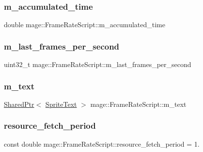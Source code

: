 \subsubsection{\texorpdfstring{m\+\_\+accumulated\+\_\+time}{m\_accumulated\_time}}
{\footnotesize\ttfamily double mage\+::\+Frame\+Rate\+Script\+::m\+\_\+accumulated\+\_\+time\hspace{0.3cm}{\ttfamily [private]}}

\hypertarget{classmage_1_1_frame_rate_script_a6126772a3b500a0c044837f432d10976}{}\label{classmage_1_1_frame_rate_script_a6126772a3b500a0c044837f432d10976} 
\subsubsection{\texorpdfstring{m\+\_\+last\+\_\+frames\+\_\+per\+\_\+second}{m\_last\_frames\_per\_second}}
{\footnotesize\ttfamily uint32\+\_\+t mage\+::\+Frame\+Rate\+Script\+::m\+\_\+last\+\_\+frames\+\_\+per\+\_\+second\hspace{0.3cm}{\ttfamily [private]}}

\hypertarget{classmage_1_1_frame_rate_script_a7d55db21f500e92914293cd6850e3b53}{}\label{classmage_1_1_frame_rate_script_a7d55db21f500e92914293cd6850e3b53} 
\subsubsection{\texorpdfstring{m\+\_\+text}{m\_text}}
{\footnotesize\ttfamily \hyperlink{namespacemage_a1e01ae66713838a7a67d30e44c67703e}{Shared\+Ptr}$<$ \hyperlink{classmage_1_1_sprite_text}{Sprite\+Text} $>$ mage\+::\+Frame\+Rate\+Script\+::m\+\_\+text\hspace{0.3cm}{\ttfamily [private]}}

\hypertarget{classmage_1_1_frame_rate_script_a34e734aedfe92891d87e5419ff60f4f2}{}\label{classmage_1_1_frame_rate_script_a34e734aedfe92891d87e5419ff60f4f2} 
\subsubsection{\texorpdfstring{resource\+\_\+fetch\+\_\+period}{resource\_fetch\_period}}
{\footnotesize\ttfamily const double mage\+::\+Frame\+Rate\+Script\+::resource\+\_\+fetch\+\_\+period = 1.\hspace{0.3cm}{\ttfamily [static]}}

